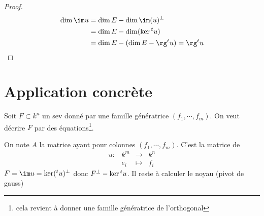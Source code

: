 \begin{proof}
\begin{align*}
    \dim \im u &= \dim E - \dim \im(u)^\bot \\&= \dim E - \dim (\ker \transpose u)\\ &= \dim E - (\dim E - \rg \transpose u)=\rg\transpose u
\end{align*}
\end{proof}

\section{Application concrète}

Soit $F\subset k^n$ un sev donné par une famille génératrice  $(f_1, \cdots , f_m)$. On veut décrire $F$ par des équations\footnote{cela revient à donner une famille génératrice de l'orthogonal}.

On note $A$ la matrice ayant pour colonnes  $(f_1, \cdots , f_m)$. C'est la matrice de  \[
\begin{array}{rrcl}
    u:& k^m  & \longrightarrow & k^n \\
    & e_i & \longmapsto & \displaystyle f_i
\end{array}
\] 
$F = \im u=\ker(\transpose u)^\bot$ donc  $F^\bot-\ker{}^t u$. Il reste à calculer le noyau (pivot de gauss)
